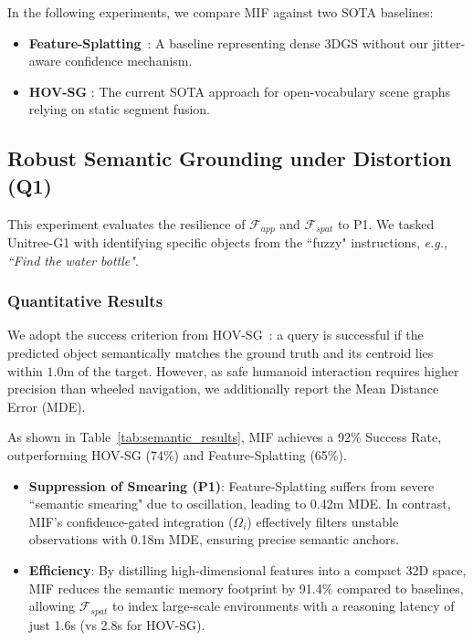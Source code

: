 \documentclass[conference]{IEEEtran}
\begin{document}
In the following experiments, we compare MIF against two SOTA baselines:
\begin{itemize}
    \item \textbf{Feature-Splatting}~\cite{qiu2024featuresplatting}: A baseline representing dense 3DGS without our jitter-aware confidence mechanism.
    \item \textbf{HOV-SG} \cite{Werby-RSS-24}: The current SOTA approach for open-vocabulary scene graphs relying on static segment fusion.
\end{itemize}

\subsection{Robust Semantic Grounding under Distortion (Q1)}
\label{sec:exp_semantic_grounding}

This experiment evaluates the resilience of $\mathcal{F}_{app}$ and $\mathcal{F}_{spat}$ to P1. We tasked Unitree-G1 with identifying specific objects from the ``fuzzy" instructions, \emph{e.g.}, \textit{``Find the water bottle"}.

\subsubsection{Quantitative Results}
We adopt the success criterion from HOV-SG~\cite{Werby-RSS-24}: a query is successful if the predicted object semantically matches the ground truth and its centroid lies within $1.0\text{m}$ of the target. However, as safe humanoid interaction requires higher precision than wheeled navigation, we additionally report the Mean Distance Error (MDE).

As shown in Table~\ref{tab:semantic_results}, MIF achieves a 92\% Success Rate, outperforming HOV-SG (74\%) and Feature-Splatting (65\%).

\begin{itemize}
    \item \textbf{Suppression of Smearing (P1)}: Feature-Splatting suffers from severe ``semantic smearing" due to oscillation, leading to 0.42m MDE. In contrast, MIF's confidence-gated integration ($\Omega_i$) effectively filters unstable observations with 0.18m MDE, ensuring precise semantic anchors.
    \item \textbf{Efficiency}: By distilling high-dimensional features into a compact 32D space, MIF reduces the semantic memory footprint by 91.4\% compared to baselines, allowing $\mathcal{F}_{spat}$ to index large-scale environments with a reasoning latency of just 1.6s (vs 2.8s for HOV-SG).
\end{itemize}
\end{document}
